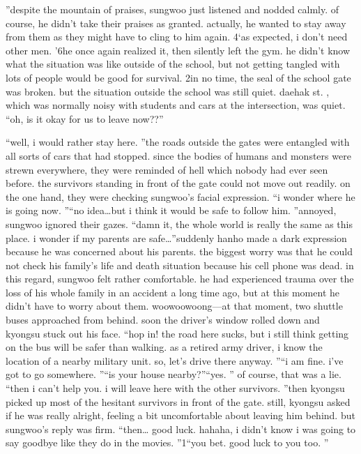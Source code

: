 ”despite the mountain of praises, sungwoo just listened and nodded calmly.
 of course, he didn’t take their praises as granted.
 actually, he wanted to stay away from them as they might have to cling to him again.
4‘as expected, i don’t need other men.
’6he once again realized it, then silently left the gym.
 he didn’t know what the situation was like outside of the school, but not getting tangled with lots of people would be good for survival.
2in no time, the seal of the school gate was broken.
 but the situation outside the school was still quiet.
 daehak st.
, which was normally noisy with students and cars at the intersection, was quiet.
“oh, is it okay for us to leave now??”

“well, i would rather stay here.
”the roads outside the gates were entangled with all sorts of cars that had stopped.
 since the bodies of humans and monsters were strewn everywhere, they were reminded of hell which nobody had ever seen before.
the survivors standing in front of the gate could not move out readily.
 on the one hand, they were checking sungwoo’s facial expression.
“i wonder where he is going now.
”“no idea…but i think it would be safe to follow him.
”annoyed, sungwoo ignored their gazes.
“damn it, the whole world is really the same as this place.
 i wonder if my parents are safe…”suddenly hanho made a dark expression because he was concerned about his parents.
 the biggest worry was that he could not check his family’s life and death situation because his cell phone was dead.
in this regard, sungwoo felt rather comfortable.
 he had experienced trauma over the loss of his whole family in an accident a long time ago, but at this moment he didn’t have to worry about them.
woowoowoong—at that moment, two shuttle buses approached from behind.
 soon the driver’s window rolled down and kyongsu stuck out his face.
“hop in! the road here sucks, but i still think getting on the bus will be safer than walking.
 as a retired army driver, i know the location of a nearby military unit.
 so, let’s drive there anyway.
”“i am fine.
 i’ve got to go somewhere.
”“is your house nearby?”“yes.
” of course, that was a lie.
“then i can’t help you.
 i will leave here with the other survivors.
”then kyongsu picked up most of the hesitant survivors in front of the gate.
still, kyongsu asked if he was really alright, feeling a bit uncomfortable about leaving him behind.
 but sungwoo’s reply was firm.
“then… good luck.
 hahaha, i didn’t know i was going to say goodbye like they do in the movies.
”1“you bet.
 good luck to you too.
”

 